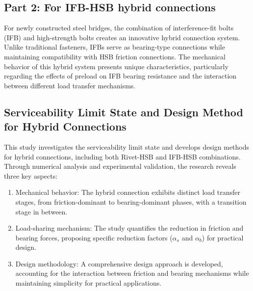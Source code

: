 \subsection{Part 2: For IFB-HSB hybrid connections}

For newly constructed steel bridges, the combination of interference-fit bolts (\ac{IFB}) and high-strength bolts creates an innovative hybrid connection system. Unlike traditional fasteners, \ac{IFB}s serve as bearing-type connections while maintaining compatibility with \ac{HSB} friction connections. The mechanical behavior of this hybrid system presents unique characteristics, particularly regarding the effects of preload on \ac{IFB} bearing resistance and the interaction between different load transfer mechanisms.



\subsection{Serviceability Limit State and Design Method for Hybrid Connections}

This study investigates the serviceability limit state and develops design methods for hybrid connections, including both Rivet-HSB and IFB-HSB combinations. Through numerical analysis and experimental validation, the research reveals three key aspects:

\begin{enumerate}
    \item Mechanical behavior: The hybrid connection exhibits distinct load transfer stages, from friction-dominant to bearing-dominant phases, with a transition stage in between.
    
    \item Load-sharing mechanism: The study quantifies the reduction in friction and bearing forces, proposing specific reduction factors ($\alpha_s$ and $\alpha_b$) for practical design.
    
    \item Design methodology: A comprehensive design approach is developed, accounting for the interaction between friction and bearing mechanisms while maintaining simplicity for practical applications.
\end{enumerate}

